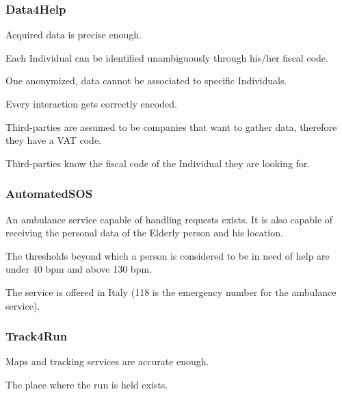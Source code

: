     \subsubsection{Data4Help}
        \begin{enumerate}[label={[}D1.\arabic*{]}, leftmargin=*]
            \item Acquired data is precise enough.
            
            \item Each Individual can be identified unambiguously through his/her fiscal code.
            
            \item One anonymized, data cannot be associated to specific Individuals.
            
            \item Every interaction gets correctly encoded.
            
            \item Third-parties are assumed to be companies that want to gather data, therefore they have a VAT code.
            
            \item Third-parties know the fiscal code of the Individual they are looking for.
        \end{enumerate}
        
        \subsubsection{AutomatedSOS}
            \begin{enumerate}[label={[}D2.\arabic*{]}, leftmargin=*]
                \item An ambulance service capable of handling requests exists. It is also capable of receiving the personal data of the Elderly person and his location.
                
                \item \label{Asos-tresholds} The thresholds beyond which a person is considered to be in need of help are under 40 bpm and above 130 bpm.
                
                \item The service is offered in Italy (118 is the emergency number for the ambulance service).
            \end{enumerate}
            
            \subsubsection{Track4Run}
                \begin{enumerate}[label={[}D3.\arabic*{]}, leftmargin=*]
                    \item Maps and tracking services are accurate enough.
                    
                    \item The place where the run is held exists.
                \end{enumerate}